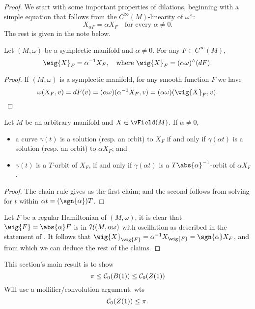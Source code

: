 \documentclass[../main-v2-manifolds.tex]{subfiles}
\begin{document}
\begin{proof}
    We start with some important properties of dilations, beginning with a simple equation that follows from the $C^\infty(M)$-linearity of $\omega^{\wedge}$:
    \[
        X_{\alpha F} = \alpha X_{F}\quad\text{for every } \alpha\neq 0.
    \]
    The rest is given in the note below.
    \begin{note}
    \begin{lemma}
        Let $(M,\omega)$ be a symplectic manifold and $\alpha\neq 0$. For any $F\in C^\infty(M)$, 
        \[
            \wig{X}_{F} = \alpha^{-1}X_{F},\quad\text{where } \wig{X}_{F} = (\alpha\omega)^{\wedge}(dF).
        \]
    \end{lemma}
    \begin{proof}
    If $(M,\omega)$ is a symplectic manifold, for any smooth function $F$ we have
    \[
    \omega(X_F, v) = dF(v)  = (\alpha\omega)(\alpha^{-1}X_{F}, v) = (\alpha\omega)(\wig{X}_F,v).
    \]
    \end{proof}
    \begin{lemma}
        Let $M$ be an arbitrary manifold and $X\in \vField(M)$. If $\alpha\neq 0$, 
        \begin{itemize}
            \item a curve $\gamma(t)$ is a solution (resp. an orbit) to $X_F$ if and only if $\gamma(\alpha t)$ is a solution (resp. an orbit) to $\alpha X_F$; and
            \item $\gamma(t)$ is a $T$-orbit of $X_F$, if and only if $\gamma(\alpha t)$ is a $T\abs{\alpha}^{-1}$-orbit of $\alpha X_F$.
        \end{itemize}
    \end{lemma}
    \begin{proof}
        The chain rule gives us the first claim; and the second follows from solving for $t$ within $\alpha t = (\sgn{\alpha})T$.
    \end{proof}
\end{note}
Let $F$ be a regular Hamiltonian of $(M,\omega)$, it is clear that $\wig{F} = \abs{\alpha} F$ is in $\mathcal{H}(M,\alpha\omega)$ with oscillation as described in the statement of . It follows that $\wig{X}_{\wig{F}} = \alpha^{-1}X_{\wig{F}}= \sgn{\alpha} X_F$, and from which we can deduce the rest of the claims.
\end{proof}

This section's main result is to show
\[
    \pi \leq \mathcal{C}_0(B(1))\leq \mathcal{C}_0(Z(1))
\]
Will use a mollifier/convolution argument.
wts
\[
    \mathcal{C}_0(Z(1))\leq \pi.
\]
\end{document}
